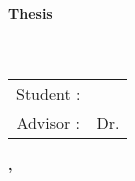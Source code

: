 \vspace*{0.5cm}
\begin{center}
	\Huge \Huge \universityEn\\[0.25cm]
	\Huge \instituteEn\\[0.25cm]
	\Huge \textbf{Thesis}\\[1.5cm]
	\large \titleCh\\[0.5cm]
	\large \titleEn\\[0.5cm]
\end{center}

\vspace{\fill}

\begin{center}
	\begin{tabular}{c l}
		\large Student : & \large \studentEn \\
    	\large Advisor : & \large Dr. \advisorEn \\[0.5cm]
	\end{tabular}
\end{center}

\vspace{3cm}

\begin{center}
	\LARGE \textbf{, }
\end{center}


